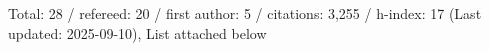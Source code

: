 Total: 28 / refereed: 20 / first author: 5 / citations: 3,255 / h-index: 17 (Last updated: 2025-09-10), List attached below